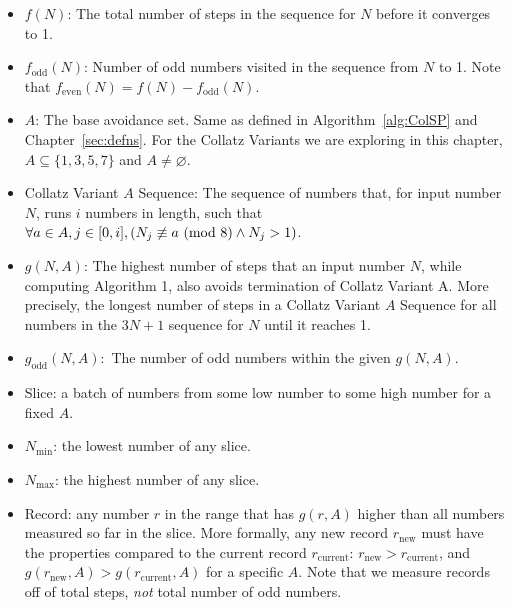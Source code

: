 \begin{itemize}
    \item $f(N)$: The total number of steps in the sequence for $N$ before it converges to 1.
    \item $f_\text{odd}(N)$: Number of odd numbers visited in the sequence from $N$ to 1. Note that $f_\text{even}(N) = f(N) - f_\text{odd}(N)$.
    \item $A$: The base avoidance set. Same as defined in Algorithm~\ref{alg:ColSP} and Chapter~\ref{sec:defns}. For the Collatz Variants we are exploring in this chapter, $A \subseteq \{1, 3, 5, 7\}$ and $A \ne \varnothing$.
    \item Collatz Variant $A$ Sequence: The sequence of numbers that, for input number $N$, runs $i$ numbers in length, such that $\forall a \in A, j \in [0, i], (N_j \not\equiv a \ (\mathrm{mod}\ 8) \wedge N_j > 1)$.
    \item $g(N,A)$: The highest number of steps that an input number $N$, while computing Algorithm 1, also avoids termination of Collatz Variant A. More precisely, the longest number of steps in a Collatz Variant $A$ Sequence for all numbers in the $3N+1$ sequence for $N$ until it reaches 1.
    \item $g_\text{odd}(N,A):$ The number of odd numbers within the given $g(N,A)$.
    \item Slice: a batch of numbers from some low number to some high number for a fixed $A$.
    \item $N_{\min}$: the lowest number of any slice.
    \item $N_{\max}$: the highest number of any slice.

    \item Record: any number $r$ in the range that has $g(r,A)$ higher than all numbers measured so far in the slice. More formally, any new record $r_\text{new}$ must have the properties compared to the current record $r_\text{current}$: $r_\text{new} > r_\text{current}$, and $g(r_\text{new},A) > g(r_\text{current},A)$ for a specific $A$. Note that we measure records off of total steps, \textit{not} total number of odd numbers.
      
\end{itemize}
